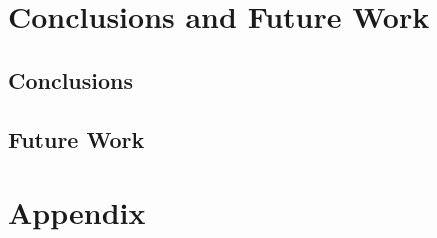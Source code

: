 \documentclass{article}
\begin{document}
\section{Conclusions and Future Work}
\label{sec:conclusion}

\subsection{Conclusions}

\subsection{Future Work}

\printbibliography

\appendix

\section{Appendix}
\label{sec:appendix}
\end{document}

